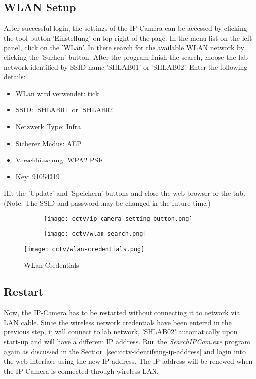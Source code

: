 \subsection{WLAN Setup}
After successful login, the settings of the IP Camera can be accessed by clicking the tool button 'Einstellung' on top right of the page. In the menu list on the left panel, click on the 'WLan'. In there search for the available WLAN network by clicking the 'Suchen' button. After the program finish the search, choose the lab network identified by SSID name 'SHLAB01' or 'SHLAB02'. Enter the following details:
\begin{itemize}
\item WLan wird verwendet: tick
\item SSID: 'SHLAB01' or 'SHLAB02'
\item Netzwerk Type: Infra
\item Sicherer Modus: AEP
\item Verschl\"usselung: WPA2-PSK
\item Key: 91054319
\end{itemize}
Hit the 'Update' and 'Speichern' buttons and close the web browser or the tab. (Note: The SSID and password may be changed in the future time.)
\begin{figure}[h]
\caption{IP-Camera WLAN settings}
\label{ip-camera-wlan-settings}
\centering
	\begin{subfigure}{.34\textwidth}
	\texttt{[image: cctv/ip-camera-setting-button.png]}
	\end{subfigure}
	\begin{subfigure}{.63\textwidth}
	\texttt{[image: cctv/wlan-search.png]}
	\end{subfigure}
\end{figure}
\begin{figure}[h]
\caption{WLan Credentials}
\label{wlan-credentials}
\centering
\texttt{[image: cctv/wlan-credentials.png]}
\end{figure}

\subsection{Restart}
Now, the IP-Camera has to be restarted without connecting it to network via LAN cable. Since the wireless network credentials have been entered in the previous step, it will connect to lab network, 'SHLAB02' automatically upon start-up and will have a different IP address. Run the \emph{SearchIPCam.exe} program again as discussed in the Section~\ref{sec:cctv-identifying-ip-address} and login into the web interface using the new IP address. The IP address will be renewed when the IP-Camera is connected through wireless LAN.


